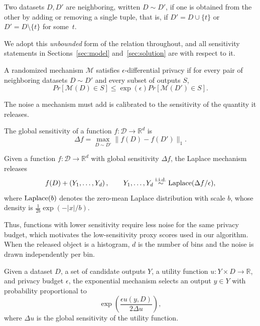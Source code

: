 \begin{definition}
\label{def:neighboring}
Two datasets $D,D'$ are neighboring, written $D\sim D'$, if one is obtained
from the other by adding or removing a single tuple, that is, if
$D'=D\cup\{t\}$ or $D'=D\setminus\{t\}$ for some~$t$.
\end{definition}

We adopt this \emph{unbounded} form of the relation throughout, and all sensitivity
statements in Sections~\ref{sec:model} and~\ref{sec:solution} are with respect to
it.

\begin{definition}
A randomized mechanism $\mathcal{M}$ satisfies $\epsilon$-differential privacy if for
every pair of neighboring datasets $D\sim D'$ and every subset of outputs $S$,
\[
Pr[\mathcal{M}(D)\in S]
\leq
\exp(\epsilon)
Pr[\mathcal{M}(D')\in S].
\]
\end{definition}

The noise a mechanism must add is calibrated to the sensitivity of the quantity it
releases.

\begin{definition}
\label{def:global-sensitivity}
The global sensitivity of a function $f:\mathcal{D}\rightarrow\mathbb{R}^d$ is
\[
\Delta f
=
\max_{D\sim D'}
\|f(D)-f(D')\|_1 .
\]
\end{definition}

\begin{definition}
Given a function $f:\mathcal{D}\rightarrow\mathbb{R}^d$ with global sensitivity
$\Delta f$, the Laplace mechanism releases
\[
f(D)+\left(Y_1,\ldots,Y_d\right),
\qquad
Y_1,\ldots,Y_d \stackrel{\text{i.i.d.}}{\sim} \operatorname{Laplace}(\Delta f/\epsilon),
\]
where $\operatorname{Laplace}(b)$ denotes the zero-mean Laplace distribution with scale $b$, whose
density is $\frac{1}{2b}\exp(-|x|/b)$.
\end{definition}

Thus, functions with lower sensitivity require less noise for the same
privacy budget, which motivates the low-sensitivity proxy scores used in
our algorithm.
When the released object is a histogram, $d$ is the number of bins and the noise is
drawn independently per bin.

\begin{definition}
\label{def:exponential-mechanism}
Given a dataset $D$, a set of candidate outputs $Y$, a utility function
$u:Y\times D\rightarrow\mathbb{R}$, and privacy budget $\epsilon$, the exponential
mechanism selects an output $y\in Y$ with probability proportional to
\[
\exp\left(
\frac{\epsilon u(y,D)}
{2\Delta u}
\right),
\]
where $\Delta u$ is the global sensitivity of the utility function.
\end{definition}

